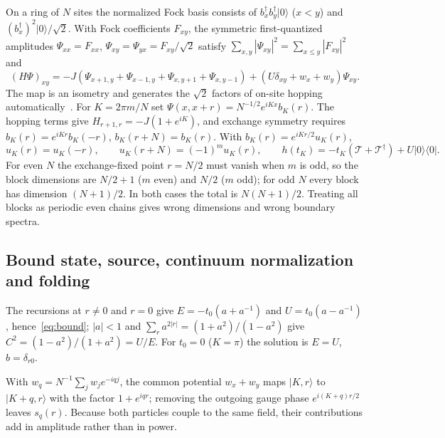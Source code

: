 \documentclass[12pt,a4paper]{article}
\theoremstyle{remark}
\begin{document}
On a ring of $N$ sites the normalized Fock basis consists of $b_x^\dagger b_y^\dagger|0\rangle$ ($x<y$) and $(b_x^\dagger)^2|0\rangle/\sqrt2$. With Fock coefficients $F_{xy}$, the symmetric first-quantized amplitudes $\Psi_{xx}=F_{xx}$, $\Psi_{xy}=\Psi_{yx}=F_{xy}/\sqrt2$ satisfy $\sum_{x,y}|\Psi_{xy}|^2=\sum_{x\le y}|F_{xy}|^2$ and
\begin{equation}
(H\Psi)_{xy}=-J(\Psi_{x+1,y}+\Psi_{x-1,y}+\Psi_{x,y+1}+\Psi_{x,y-1})+(U\delta_{xy}+w_x+w_y)\Psi_{xy}.
\end{equation}
The map is an isometry and generates the $\sqrt2$ factors of on-site hopping automatically~\cite{ValientePetrosyan2008}. For $K=2\pi m/N$ set $\Psi(x,x+r)=N^{-1/2}e^{iKx}b_K(r)$. The hopping terms give $H_{r+1,r}=-J(1+e^{iK})$, and exchange symmetry requires $b_K(r)=e^{iKr}b_K(-r)$, $b_K(r+N)=b_K(r)$. With $b_K(r)=e^{iKr/2}u_K(r)$,
\begin{equation}
u_K(r)=u_K(-r),\qquad u_K(r+N)=(-1)^m u_K(r),\qquad h(t_K)=-t_K(\mathcal{T}+\mathcal{T}^\dagger)+U|0\rangle\langle0| .
\end{equation}
For even $N$ the exchange-fixed point $r=N/2$ must vanish when $m$ is odd, so the block dimensions are $N/2+1$ ($m$ even) and $N/2$ ($m$ odd); for odd $N$ every block has dimension $(N+1)/2$. In both cases the total is $N(N+1)/2$. Treating all blocks as periodic even chains gives wrong dimensions and wrong boundary spectra.

\subsection{Bound state, source, continuum normalization and folding}\label{app:P2}

The recursions at $r\neq0$ and $r=0$ give $E=-t_0(a+a^{-1})$ and $U=t_0(a-a^{-1})$, hence~\eqref{eq:bound}; $|a|<1$ and $\sum_r a^{2|r|}=(1+a^2)/(1-a^2)$ give $C^2=(1-a^2)/(1+a^2)=U/E$. For $t_0=0$ ($K=\pi$) the solution is $E=U$, $b=\delta_{r0}$.

With $w_q=N^{-1}\sum_jw_je^{-iqj}$, the common potential $w_x+w_y$ maps $|K,r\rangle$ to $|K+q,r\rangle$ with the factor $1+e^{iqr}$; removing the outgoing gauge phase $e^{i(K+q)r/2}$ leaves $s_q(r)$. Because both particles couple to the same field, their contributions add in amplitude rather than in power.
\end{document}
